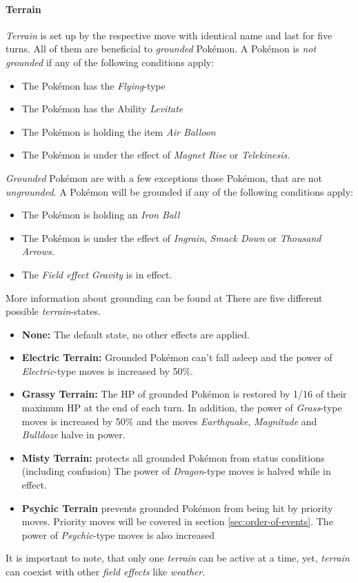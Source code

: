 \paragraph{Terrain}
\textit{Terrain} is set up by the respective move with identical name and last for five turns. 
All of them are beneficial to \textit{grounded} Pokémon. A Pokémon is \textit{not grounded} if any of the 
following conditions apply:
\begin{itemize}
	\item The Pokémon has the \textit{Flying}-type
	\item The Pokémon has the Ability \textit{Levitate}
	\item The Pokémon is holding the item \textit{Air Balloon}
	\item The Pokémon is under the effect of \textit{Magnet Rise} or \textit{Telekinesis}.
\end{itemize}
\textit{Grounded} Pokémon are with a few exceptions those Pokémon, that are not \textit{ungrounded}. A 
Pokémon will be grounded if any of the following conditions apply:
\begin{itemize}
	\item The Pokémon is holding an \textit{Iron Ball}
	\item The Pokémon is under the effect of \textit{Ingrain}, \textit{Smack Down} or \textit{Thousand Arrows}.
	\item The \textit{Field effect} \textit{Gravity} is in effect.
\end{itemize}
More information about grounding can be found at \cite{Bulbapedia:Grounded}
There are five different possible \textit{terrain}-states. 
\begin{itemize}
	\item \textbf{None:} The default state, no other effects are applied. 
	\item \textbf{Electric Terrain:} Grounded Pokémon can't fall asleep and the power of \textit{Electric}-type
		moves is increased by 50\%.
	\item \textbf{Grassy Terrain:} The HP of grounded Pokémon is restored by 1/16 of their maximum HP at the
		end of each turn. In addition, the power of \textit{Grass}-type moves is increased by 50\% and the 
		moves \textit{Earthquake}, \textit{Magnitude} and \textit{Bulldoze} halve in power. 
	\item \textbf{Misty Terrain:} protects all grounded Pokémon from status conditions (including confusion)
		The power of \textit{Dragon}-type moves is halved while in effect. 
	\item \textbf{Psychic Terrain} prevents grounded Pokémon from being hit by priority moves. Priority
	moves will be covered in section \ref{sec:order-of-events}. The power of \textit{Psychic}-type moves is also increased
\end{itemize}
It is important to note, that only one \textit{terrain} can be active at a time, yet, \textit{terrain}
can coexist with other \textit{field effects} like \textit{weather}.

